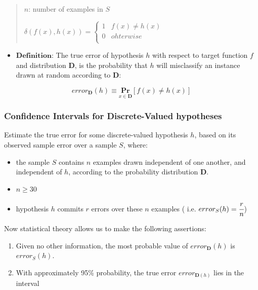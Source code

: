 \begin{quote}
\(n\): number of examples in \(S\)

\(\delta(f(x),h(x))=\left\{\begin{matrix}
1 &  f(x)\neq h(x)\\
0 &  ohterwise\\
\end{matrix}\right.\)
\end{quote}

\begin{itemize}
\item
  \(\textbf{Definition}\): The true error of hypothesis \(h\) with
  respect to target function \(f\) and distribution \(\boldsymbol{D}\),
  is the probability that \(h\) will misclassify an instance drawn at
  random according to \(\boldsymbol{D}\):
\end{itemize}

\[error_{\boldsymbol{D}}(h)\equiv\underset{x\in \boldsymbol{D}}{\mathbf{Pr}}[f(x)\neq h(x)]\]

\hypertarget{confidence-intervals-for-discrete-valued-hypotheses}{%
\subsubsection{Confidence Intervals for Discrete-Valued
hypotheses}\label{confidence-intervals-for-discrete-valued-hypotheses}}

Estimate the true error for some discrete-valued hypothesis \(h\), based
on its observed sample error over a sample \(S\), where:

\begin{itemize}
\item
  the sample \(S\) contains \(n\) examples drawn independent of one
  another, and independent of \(h\), according to the probability
  distribution \(\boldsymbol{D}\).
\item
  \(n\ge 30\)
\item
  hypothesis \(h\) commits \(r\) errors over these \(n\) examples ( i.e.
  \(error_S(h)=\cfrac{r}{n}\))
\end{itemize}

Now statistical theory allows us to make the following assertions:

\begin{enumerate}
\def\labelenumi{\arabic{enumi}.}
\item
  Given no other information, the most probable value of
  \(error_{\boldsymbol{D}}(h)\) is \(error_S(h)\).
\item
  With approximately 95\% probability, the true error
  \(error_{\boldsymbol{D}(h)}\) lies in the interval
\end{enumerate}

